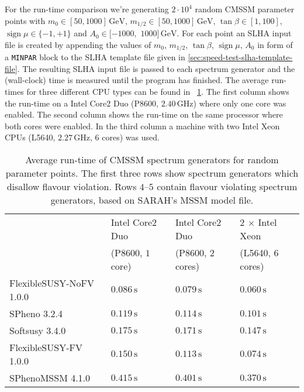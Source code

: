 \documentclass[final,3p,11pt,pdflatex]{elsarticle}
\newcommand{\code}[1]{\lstinline|#1|}  %
\newcommand{\unit}[1]{\,\text{#1}}      %
\newcommand{\tabref}[1]{\tablename~\ref{#1}}
\DeclareMathOperator{\sign}{sign}
\begin{document}
For the run-time comparison we're generating $2\cdot 10^{4}$ random
CMSSM parameter points with $m_0\in [50,1000]\unit{GeV}$, $m_{1/2}\in
[50,1000]\unit{GeV}$, $\tan\beta\in [1,100]$, $\sign\mu\in \{-1,+1\}$
and $A_0\in [-1000,$ $1000]\unit{GeV}$.  For each point an SLHA input
file is created by appending the values of $m_0$, $m_{1/2}$,
$\tan\beta$, $\sign\mu$, $A_0$ in form of a \code{MINPAR} block to the
SLHA template file given in
\ref{sec:speed-test-slha-template-file}.  The resulting SLHA input
file is passed to each spectrum generator and the (wall-clock) time is
measured until the program has finished.  The average run-times for
three different CPU types can be found in
\tabref{tab:run-time-comparison}.  The first column shows the run-time
on a Intel Core2 Duo (P8600, $2.40\unit{GHz}$) where only one core was
enabled.  The second column shows the run-time on the same processor
where both cores were enabled.  In the third column a machine with two
Intel Xeon CPUs (L5640, $2.27\unit{GHz}$, $6$ cores) was used.
%
\begin{table}[tbh]
  \centering
  \begin{tabular}{llll}
    \toprule
                            & Intel Core2 Duo    & Intel Core2 Duo   & $2$ $\times$ Intel Xeon\\
                            & (P8600, $1$ core)  & (P8600, $2$ cores)& (L5640, $6$ cores)\\
    \midrule
    FlexibleSUSY-NoFV 1.0.0 & $0.086\unit{s}$    & $0.079\unit{s}$   & $0.060\unit{s}$\\
    SPheno 3.2.4            & $0.119\unit{s}$    & $0.114\unit{s}$   & $0.101\unit{s}$\\
    Softsusy 3.4.0          & $0.175\unit{s}$    & $0.171\unit{s}$   & $0.147\unit{s}$\\
    \midrule
    FlexibleSUSY-FV 1.0.0   & $0.150\unit{s}$    & $0.113\unit{s}$   & $0.074\unit{s}$\\
    SPhenoMSSM 4.1.0        & $0.415\unit{s}$    & $0.401\unit{s}$   & $0.370\unit{s}$\\
    \bottomrule
  \end{tabular}
  \caption{Average run-time of CMSSM spectrum generators
    for random parameter points.  The first three rows show
    spectrum generators which disallow flavour violation.  Rows
    $4$--$5$ contain flavour violating spectrum generators, based
    on SARAH's MSSM model file.}
  \label{tab:run-time-comparison}
\end{table}
\end{document}
